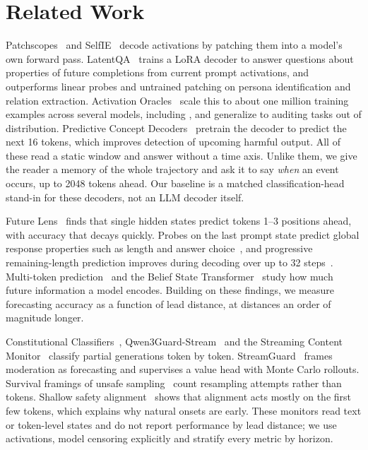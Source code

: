 \section{Related Work}
\label{sec:related}

Patchscopes~\citep{ghandeharioun2024patchscopes} and SelfIE~\citep{chen2024selfie} decode activations by patching them into a model's own forward pass.
LatentQA~\citep{pan2024latentqa} trains a LoRA decoder to answer questions about properties of future completions from current prompt activations, and outperforms linear probes and untrained patching on persona identification and relation extraction.
Activation Oracles~\citep{karvonen2025activation} scale this to about one million training examples across several models, including \qwen, and generalize to auditing tasks out of distribution.
Predictive Concept Decoders~\citep{pcd2025} pretrain the decoder to predict the next 16 tokens, which improves detection of upcoming harmful output.
All of these read a static window and answer without a time axis.
Unlike them, we give the reader a memory of the whole trajectory and ask it to say \emph{when} an event occurs, up to 2048 tokens ahead.
Our \directao baseline is a matched classification-head stand-in for these decoders, not an LLM decoder itself.

Future Lens~\citep{pal2023futurelens} finds that single hidden states predict tokens 1--3 positions ahead, with accuracy that decays quickly.
Probes on the last prompt state predict global response properties such as length and answer choice~\citep{dong2025emergent}, and progressive remaining-length prediction improves during decoding over up to 32 steps~\citep{egtp2026}.
Multi-token prediction~\citep{gloeckle2024mtp} and the Belief State Transformer~\citep{hu2024bst} study how much future information a model encodes.
Building on these findings, we measure forecasting accuracy as a function of lead distance, at distances an order of magnitude longer.

Constitutional Classifiers~\citep{sharma2025constitutional}, Qwen3Guard-Stream~\citep{qwen2025guard} and the Streaming Content Monitor~\citep{li2025scm} classify partial generations token by token.
StreamGuard~\citep{stream2026guard} frames moderation as forecasting and supervises a value head with Monte Carlo rollouts.
Survival framings of unsafe sampling~\citep{davidov2025time} count resampling attempts rather than tokens. Shallow safety alignment~\citep{qi2024shallow} shows that alignment acts mostly on the first few tokens, which explains why natural onsets are early.
These monitors read text or token-level states and do not report performance by lead distance; we use activations, model censoring explicitly and stratify every metric by horizon.

